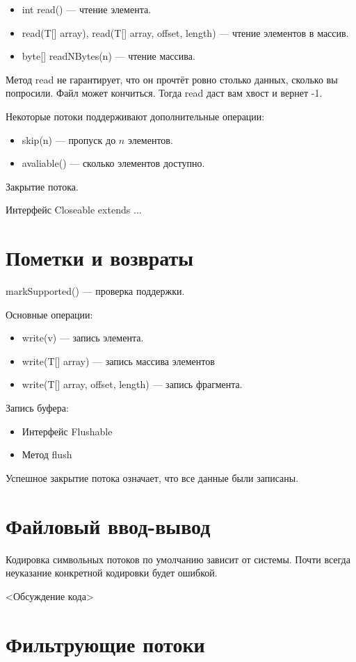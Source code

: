 \begin{itemize}\itemsep=-1mm
    \item \cmd int read() --- чтение элемента.
    \item \cmd read(T[] array), read(T[] array, offset, length) --- чтение элементов в массив.
    \item \cmd byte[] readNBytes(n) --- чтение массива.
\end{itemize}
Метод read не гарантирует, что он прочтёт ровно столько данных, сколько вы попросили.
Файл может кончиться. 
Тогда read даст вам хвост и вернет -1.

Некоторые потоки поддерживают дополнительные операции:
\begin{itemize}\itemsep=-1mm
    \item \cmd skip(n) --- пропуск до $n$ элементов.
    \item \cmd avaliable() --- сколько элементов доступно.
\end{itemize}

Закрытие потока.

Интерфейс Closeable extends 
$\ldots$

\section{Пометки и возвраты}
\cmd markSupported() --- проверка поддержки.

Основные операции:
\begin{itemize}\itemsep=-1mm
    \item \cmd write(v) --- запись элемента.
    \item \cmd write(T[] array) --- запись массива элементов
    \item \cmd write(T[] array, offset, length) --- запись фрагмента.
\end{itemize}

Запись буфера:
\begin{itemize}\itemsep=-1mm
    \item Интерфейс Flushable
    \item Метод flush
\end{itemize}

Успешное закрытие потока означает, что все данные были записаны.

\section{Файловый ввод-вывод}
Кодировка символьных потоков по умолчанию зависит от системы.
Почти всегда неуказание конкретной кодировки будет ошибкой.

<Обсуждение кода>
\section{Фильтрующие потоки}



\endinput
